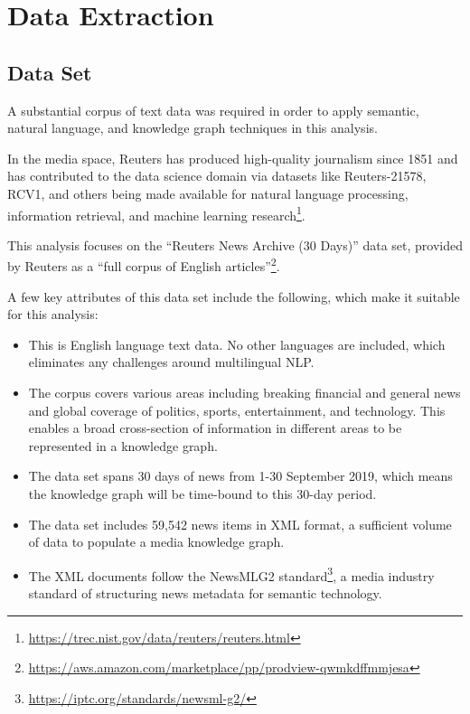 \documentclass[11pt]{article}
\begin{document}
\section{Data Extraction}

  \subsection{Data Set}
  A substantial corpus of text data was required in order to apply semantic, natural language, and knowledge graph techniques in this analysis.

  In the media space, Reuters has produced high-quality journalism since 1851 and has contributed to the data science domain via datasets like Reuters-21578\cite{reuters-21578}, RCV1\cite{lewis2004rcv1}, and others\cite{reuters-corpora} being made available for natural language processing, information retrieval, and machine learning research\footnote{\url{https://trec.nist.gov/data/reuters/reuters.html}}.

  This analysis focuses on the ``Reuters News Archive (30 Days)'' data set, provided by Reuters as a ``full corpus of English articles''\footnote{\url{https://aws.amazon.com/marketplace/pp/prodview-qwmkdffmmjesa}}.

  A few key attributes of this data set include the following, which make it suitable for this analysis:
  \begin{itemize}
    \item{This is English language text data. No other languages are included, which eliminates any challenges around multilingual NLP.}
    \item{The corpus covers various areas including breaking financial and general news and global coverage of politics, sports, entertainment, and technology. This enables a broad cross-section of information in different areas to be represented in a knowledge graph.}
    \item{The data set spans 30 days of news from 1-30 September 2019, which means the knowledge graph will be time-bound to this 30-day period.}
    \item{The data set includes 59,542 news items in XML format, a sufficient volume of data to populate a media knowledge graph.}
    \item{The XML documents follow the NewsMLG2 standard\footnote{\url{https://iptc.org/standards/newsml-g2/}}, a media industry standard of structuring news metadata for semantic technology.}
  \end{itemize}
\end{document}
